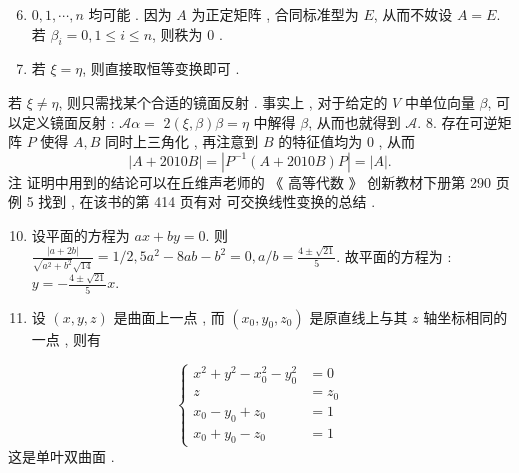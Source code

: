 \documentclass[10pt]{article}
\begin{document}
\begin{enumerate}
  \setcounter{enumi}{5}
  \item $0,1, \cdots, n$  均可能 .  因为  $A$  为正定矩阵 ,  合同标准型为  $E$,  从而不奻设  $A=E$.  若  $\beta_{i}=0,1 \leq i \leq n$,  则秩为  0 .

  \item  若  $\xi=\eta$,  则直接取恒等变换即可 .

\end{enumerate}
 若  $\xi \neq \eta$,  则只需找某个合适的镜面反射 .  事实上 ,  对于给定的  $V$  中单位向量  $\beta$,  可以定义镜面反射 : $\mathscr{A} \alpha=$ $2(\xi, \beta) \beta=\eta$  中解得  $\beta$,  从而也就得到  $\mathscr{A}$. 8.  存在可逆矩阵  $P$  使得  $A, B$  同时上三角化 ,  再注意到  $B$  的特征值均为  0 ,  从而 
$$
|A+2010 B|=\left|P^{-1}(A+2010 B) P\right|=|A| .
$$
 注   证明中用到的结论可以在丘维声老师的 《 高等代数 》 创新教材下册第  290  页例  5  找到 ,  在该书的第  414  页有对   可交换线性变换的总结 .

\begin{enumerate}
  \setcounter{enumi}{9}
  \item  设平面的方程为  $a x+b y=0$.  则  $\frac{|a+2 b|}{\sqrt{a^{2}+b^{2}} \sqrt{14}}=1 / 2,5 a^{2}-8 a b-b^{2}=0, a / b=\frac{4 \pm \sqrt{21}}{5}$.  故平面的方程为 : $y=-\frac{4 \pm \sqrt{21}}{5} x .$

  \item  设  $(x, y, z)$  是曲面上一点 ,  而  $\left(x_{0}, y_{0}, z_{0}\right)$  是原直线上与其  $z$  轴坐标相同的一点 ,  则有 

\end{enumerate}
$$
\left\{\begin{aligned}
x^{2}+y^{2}-x_{0}^{2}-y_{0}^{2} &=0 \\
z &=z_{0} \\
x_{0}-y_{0}+z_{0} &=1 \\
x_{0}+y_{0}-z_{0} &=1
\end{aligned}\right.
$$
 这是单叶双曲面 .
\end{document}
